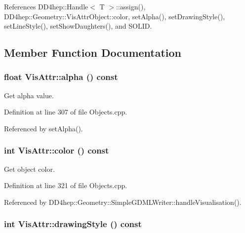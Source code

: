References DD4hep::Handle$<$ T $>$::assign(), DD4hep::Geometry::VisAttrObject::color, setAlpha(), setDrawingStyle(), setLineStyle(), setShowDaughters(), and SOLID.

\subsection{Member Function Documentation}
\hypertarget{class_d_d4hep_1_1_geometry_1_1_vis_attr_a65411a5cd427ffb4aa07c93c23a26937}{
\subsubsection[{alpha}]{\setlength{\rightskip}{0pt plus 5cm}float VisAttr::alpha () const}}
\label{class_d_d4hep_1_1_geometry_1_1_vis_attr_a65411a5cd427ffb4aa07c93c23a26937}


Get alpha value. 

Definition at line 307 of file Objects.cpp.

Referenced by setAlpha().\hypertarget{class_d_d4hep_1_1_geometry_1_1_vis_attr_a8952252a0fd14fdbce0d28d46af92e8e}{
\subsubsection[{color}]{\setlength{\rightskip}{0pt plus 5cm}int VisAttr::color () const}}
\label{class_d_d4hep_1_1_geometry_1_1_vis_attr_a8952252a0fd14fdbce0d28d46af92e8e}


Get object color. 

Definition at line 321 of file Objects.cpp.

Referenced by DD4hep::Geometry::SimpleGDMLWriter::handleVisualisation().\hypertarget{class_d_d4hep_1_1_geometry_1_1_vis_attr_a91c2eb7ffa5421d48d4a6ad5ef0739cc}{
\subsubsection[{drawingStyle}]{\setlength{\rightskip}{0pt plus 5cm}int VisAttr::drawingStyle () const}}
\label{class_d_d4hep_1_1_geometry_1_1_vis_attr_a91c2eb7ffa5421d48d4a6ad5ef0739cc}


